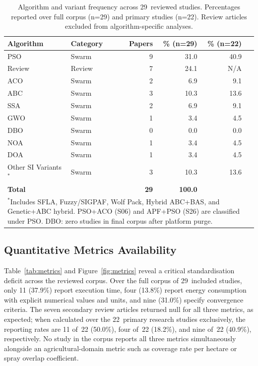 \documentclass[review,3p]{elsarticle}
\begin{document}
\begin{table}[htbp]
\centering
\caption{Algorithm and variant frequency across 29~reviewed studies. Percentages
reported over full corpus (n=29) and primary studies (n=22). Review articles
excluded from algorithm-specific analyses.}
\label{tab:algorithms}
\begin{tabular}{llrrrr}
\toprule
\textbf{Algorithm} & \textbf{Category} & \textbf{Papers} & \textbf{\% (n=29)} & \textbf{\% (n=22)} \\
\midrule
PSO          & Swarm  &  9 & 31.0 & 40.9 \\
Review       & Review &  7 & 24.1 & N/A  \\
ACO          & Swarm  &  2 &  6.9 &  9.1 \\
ABC          & Swarm  &  3 & 10.3 & 13.6 \\
SSA          & Swarm  &  2 &  6.9 &  9.1 \\
GWO          & Swarm  &  1 &  3.4 &  4.5 \\
DBO          & Swarm  &  0 &  0.0 &  0.0 \\
NOA          & Swarm  &  1 &  3.4 &  4.5 \\
DOA          & Swarm  &  1 &  3.4 &  4.5 \\
Other SI Variants$^*$ & Swarm & 3 & 10.3 & 13.6 \\
\midrule
\textbf{Total} & & \textbf{29} & \textbf{100.0} & \\
\bottomrule
\multicolumn{6}{p{0.92\textwidth}}{\scriptsize$^*$Includes SFLA, Fuzzy/SIGPAF, Wolf Pack,
Hybrid ABC+BAS, and Genetic+ABC hybrid. PSO+ACO (S06) and APF+PSO (S26) are classified
under PSO. DBO: zero studies in final corpus after platform purge.}
\end{tabular}
\end{table}

\subsection{Quantitative Metrics Availability}

Table~\ref{tab:metrics} and Figure~\ref{fig:metrics} reveal a critical
standardisation deficit across the reviewed corpus. Over the full corpus of
29~included studies, only 11 (37.9\%) report execution time, four (13.8\%)
report energy consumption with explicit numerical values and units, and nine
(31.0\%) specify convergence criteria. The seven secondary review articles
returned null for all three metrics, as expected; when calculated over the
22~primary research studies exclusively, the reporting rates are 11 of~22
(50.0\%), four of~22 (18.2\%), and nine of~22 (40.9\%), respectively. No study
in the corpus reports all three metrics simultaneously alongside an
agricultural-domain metric such as coverage rate per hectare or spray overlap
coefficient.
\end{document}
